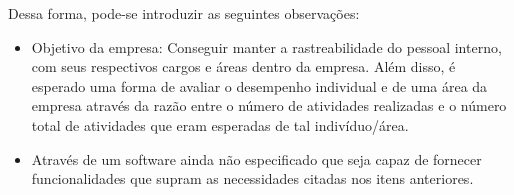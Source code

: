 Dessa forma, pode-se introduzir as seguintes observações:

\begin{itemize}
\item Objetivo da empresa: Conseguir manter a rastreabilidade do pessoal interno, com seus respectivos cargos e áreas dentro da empresa. Além disso, é esperado uma forma de avaliar o desempenho individual e de uma área da empresa através da razão entre o número de atividades realizadas e o número total de atividades que eram esperadas de tal indivíduo/área.
\item Através de um software ainda não especificado que seja capaz de fornecer funcionalidades que supram as necessidades citadas nos itens anteriores.
\end{itemize}
